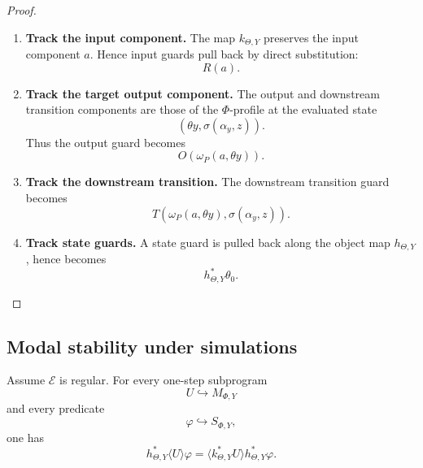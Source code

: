 \begin{proof}
\leavevmode
\begin{enumerate}
\item \textbf{Track the input component.}
The map \(k_{\Theta,Y}\) preserves the input component \(a\).  Hence input
guards pull back by direct substitution:
\[
R(a).
\]

\item \textbf{Track the target output component.}
The output and downstream transition components are those of the
\(\Phi\)-profile at the evaluated state
\[
(\theta y,\sigma(\alpha_y,z)).
\]
Thus the output guard becomes
\[
O(\omega_P(a,\theta y)).
\]

\item \textbf{Track the downstream transition.}
The downstream transition guard becomes
\[
T(\omega_P(a,\theta y),\sigma(\alpha_y,z)).
\]

\item \textbf{Track state guards.}
A state guard is pulled back along the object map \(h_{\Theta,Y}\), hence
becomes
\[
h_{\Theta,Y}^{\ast}\theta_0.
\]
\end{enumerate}
\end{proof}

\subsection{Modal stability under simulations}
\label{subsec:poly-relative-modal-stability-simulation}

\begin{proposition}
\label{prop:poly-relative-diamond-stability-simulation}
Assume \(\mathcal E\) is regular.  For every one-step subprogram
\[
U\hookrightarrow M_{\Phi,Y}
\]
and every predicate
\[
\varphi\hookrightarrow S_{\Phi,Y},
\]
one has
\[
h_{\Theta,Y}^\ast\langle U\rangle\varphi
=
\langle k_{\Theta,Y}^\ast U\rangle h_{\Theta,Y}^\ast\varphi.
\]
\end{proposition}

